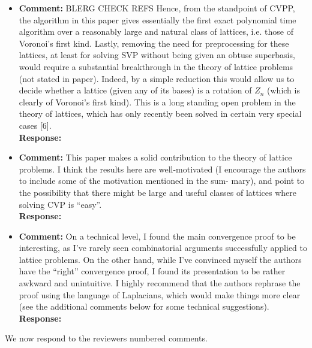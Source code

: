 \documentclass[a4paper,10pt]{article}
\begin{document}
\begin{itemize}
\item\textbf{Comment:} 
BLERG CHECK REFS Hence, from the standpoint of CVPP, the algorithm in this paper gives essentially the first
exact polynomial time algorithm over a reasonably large and natural class of lattices, i.e. those
of Voronoi’s first kind. Lastly, removing the need for preprocessing for these lattices, at least for
solving SVP without being given an obtuse superbasis, would require a substantial breakthrough
in the theory of lattice problems (not stated in paper). Indeed, by a simple reduction this would
allow us to decide whether a lattice (given any of its bases) is a rotation of $Z_n$ (which is clearly
of Voronoi’s first kind). This is a long standing open problem in the theory of lattices, which has
only recently been solved in certain very special cases [6].
\\\textbf{Response:}

\item\textbf{Comment:} 
This paper makes a solid contribution to the theory of lattice problems. I think the results here are
well-motivated (I encourage the authors to include some of the motivation mentioned in the sum-
mary), and point to the possibility that there might be large and useful classes of lattices where
solving CVP is “easy”.
\\\textbf{Response:}

\item\textbf{Comment:} 
On a technical level, I found the main convergence proof to be interesting, as I’ve rarely seen
combinatorial arguments successfully applied to lattice problems. On the other hand, while I’ve
convinced myself the authors have the “right” convergence proof, I found its presentation to be
rather awkward and unintuitive. I highly recommend that the authors rephrase the proof using
the language of Laplacians, which would make things more clear (see the additional comments
below for some technical suggestions).
\\\textbf{Response:}

\end{itemize}

We now respond to the reviewers numbered comments.
\end{document}
